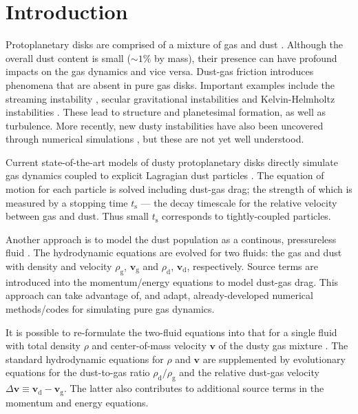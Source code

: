 \documentclass[iop, numberedappendix]{emulateapj}
\newcommand{\rhod}{\rho_\mathrm{d}}
\newcommand{\rhog}{\rho_\mathrm{g}}
\newcommand{\tstop}{t_\mathrm{s}}
\begin{document}
\section{Introduction}
Protoplanetary disks are comprised of a mixture of gas and dust
\citep{chiang10}. Although the overall dust content is small
($\sim 1\%$ by mass), their presence can have profound impacts on the 
gas dynamics and vice versa. Dust-gas friction introduces phenomena
that are absent in pure gas disks. Important examples include the
streaming instability 
\citep{youdin05a,youdin07b,johansen07}, secular gravitational
instabilities \citep{ward00,youdin11,michikoshi12,takahashi14} and
Kelvin-Helmholtz instabilities
\citep{chiang08,barranco09,lee10}. These lead to structure and
planetesimal formation, as well as turbulence. 
More recently, new 
dusty instabilities have also been uncovered through numerical
simulations \citep{loren15,loren16,lamb16}, but these are not yet well
understood. 



Current state-of-the-art models of dusty protoplanetary
disks directly simulate gas dynamics coupled to explicit
Lagragian dust particles
\citep{nelson10,bai10,johansen11,yang14,zhu14,gibbons15,simon16,baruteau16}. 
The equation of motion for each particle is solved 
including dust-gas drag; the strength of which is measured 
by a stopping time $\tstop$ --- the decay timescale for the 
relative velocity between gas and dust. Thus small $\tstop$
corresponds to tightly-coupled particles. 


Another approach is to model the dust population as a continous, pressureless
fluid 
\citep{paardekooper06b,meheut12,laibe12,loren14,fu14b,surville16}. The 
hydrodynamic equations are evolved for two fluids: the gas and dust with density and
velocity $\rhog$, $\bm{v}_\mathrm{g}$ and $\rhod$, 
$\bm{v}_\mathrm{d}$, respectively. Source terms are introduced into
the momentum/energy equations to model dust-gas drag. This approach
can take advantage of, and adapt, already-developed numerical methods/codes for
simulating pure gas dynamics. 


It is possible to re-formulate the two-fluid equations into that for a
single fluid with total density $\rho$ and center-of-mass
velocity $\bm{v}$ of the dusty gas mixture
\citep{laibe14}. The standard hydrodynamic equations for
$\rho$ and $\bm{v}$ are supplemented by evolutionary equations for
the dust-to-gas ratio $\rhod/\rhog$ and the relative dust-gas velocity
$\Delta\bm{v}\equiv \bm{v}_\mathrm{d}-\bm{v}_\mathrm{g}$. The latter also contributes to 
additional source terms in the momentum and energy equations.  
\end{document}
